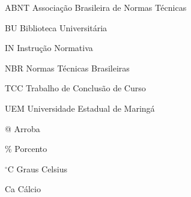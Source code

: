 
\listoffigures*
\cleardoublepage



\listoftables*
\cleardoublepage

\begin{siglas}
	\item[ABNT] Associação Brasileira de Normas Técnicas
	\item[BU] Biblioteca Universitária
	\item[IN] Instrução Normativa
	\item[NBR] Normas Técnicas Brasileiras
	\item[TCC] Trabalho de Conclusão de Curso
	\item[UEM] Universidade Estadual de Maringá
\end{siglas}



\begin{simbolos}
  \item[@] Arroba
  \item[\%] Porcento
  \item[$^\circ$C] Graus Celsius
  \item[Ca] Cálcio
\end{simbolos}

